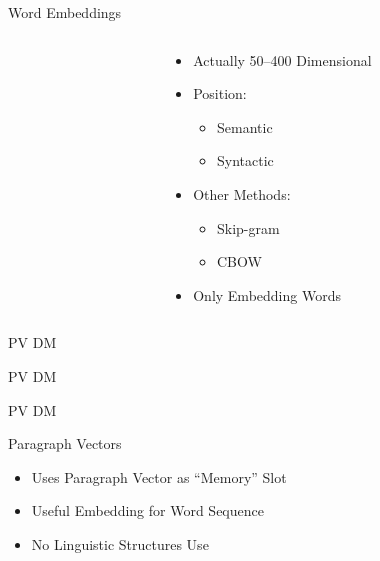 \documentclass[12pt,landscape,english]{beamer}
\begin{document}
\begin{frame}{Word Embeddings}
	\begin{columns}
		\begin{column}{0.5\textwidth}
			\centering\resizebox{\textwidth}{!}{
			
			}
		\end{column}
		\begin{column}{0.5\textwidth}
			\begin{itemize}
				\item Actually 50--400 Dimensional
				\item Position:
					\begin{itemize}
						\item Semantic
						\item Syntactic						
					\end{itemize}						
			\end{itemize}	
			\begin{itemize}
				\item Other Methods:
				\begin{itemize}
					\item Skip-gram
					\item CBOW					
				\end{itemize}	
				\item Only Embedding Words			
			\end{itemize}		
		\end{column}
	\end{columns}
\end{frame}

\begin{frame} {PV DM} 
	\hskip-1cm
	\resizebox{!}{0.7\textheight}{}
\end{frame}


\begin{frame} {PV DM} 
	\hskip-1cm
	\resizebox{!}{0.7\textheight}{}
\end{frame}


\begin{frame} {PV DM}
	\hskip-1cm
	\resizebox{!}{0.7\textheight}{}
	
\end{frame}

\begin{frame} {Paragraph Vectors}
	\centering\resizebox{!}{0.4\textheight}{}
	\begin{itemize}
		\item Uses Paragraph Vector as ``Memory'' Slot
		\item Useful Embedding for Word Sequence
		\item No Linguistic Structures Use
	\end{itemize}	

\end{frame}
	
\end{document}
